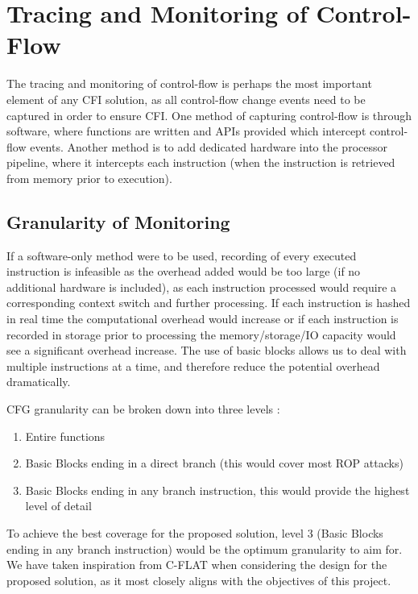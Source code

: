 \section{Tracing and Monitoring of Control-Flow}

The tracing and monitoring of control-flow is perhaps the most important element of any CFI solution, as all control-flow change events need to be captured in order to ensure CFI. One method of capturing control-flow is through software, where functions are written and APIs provided which intercept control-flow events. Another method is to add dedicated hardware into the processor pipeline, where it intercepts each instruction (when the instruction is retrieved from memory prior to execution).

\subsection{Granularity of Monitoring}\label{implementationGranularity}

If a software-only method were to be used, recording of every executed instruction is infeasible as the overhead added would be too large (if no additional hardware is included), as each instruction processed would require a corresponding context switch and further processing. If each instruction is hashed in real time the computational overhead would increase or if each instruction is recorded in storage prior to processing the memory\slash storage\slash IO capacity would see a significant overhead increase. The use of basic blocks allows us to deal with multiple instructions at a time, and therefore reduce the potential overhead dramatically.

CFG granularity can be broken down into three levels \cite{Abera2016}:
\begin{enumerate}
	\item{Entire functions}
	\item{Basic Blocks ending in a direct branch (this would cover most ROP attacks)}
	\item{Basic Blocks ending in any branch instruction, this would provide the highest level of detail}
\end{enumerate}

To achieve the best coverage for the proposed solution, level 3 (Basic Blocks ending in any branch instruction) would be the optimum granularity to aim for. We have taken inspiration from C-FLAT\cite{Abera2016} when considering the design for the proposed solution, as it most closely aligns with the objectives of this project.

